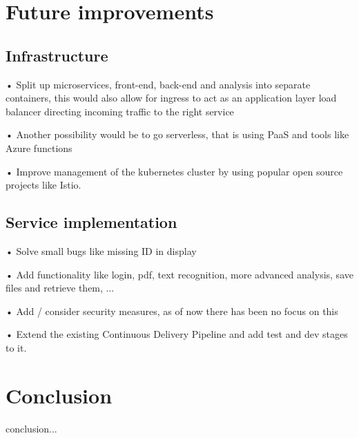 \documentclass[conference]{IEEEtran}
\begin{document}
\section{Future improvements}
\label{sec:future-improvments}
\subsection{Infrastructure}
•	Split up microservices, front-end, back-end and analysis into separate containers, this would also allow for ingress to act as an application layer load balancer directing incoming traffic to the right service

•	Another possibility would be to go serverless, that is using PaaS and tools like Azure functions

•	Improve management of the kubernetes cluster by using popular open source projects like Istio.

\subsection{Service implementation}
•	Solve small bugs like missing ID in display

•	Add functionality like login, pdf, text recognition, more advanced analysis, save files and retrieve them, ...

•	Add / consider security measures, as of now there has been no focus on this

•	Extend the existing Continuous Delivery Pipeline and add test and dev stages to it.

\section{Conclusion}
\label{sec:conclusion}
conclusion...




\end{document}
